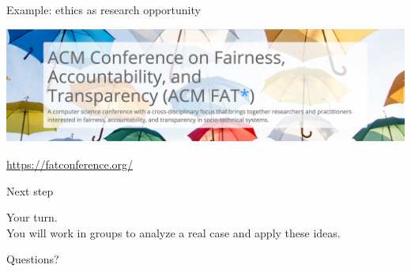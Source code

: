 \documentclass{beamer}
\def\vf{\vfill}
\begin{document}
\begin{frame}{Example: ethics as research opportunity}

\begin{center}
\includegraphics[width=\textwidth]{figures/fat_star}
\end{center}

\vf
\url{https://fatconference.org/}
\end{frame}
\begin{frame}{Next step}

Your turn.\\
You will work in groups to analyze a real case and apply these ideas. 

\end{frame}
\begin{frame}[standout]

\begin{center}
	\LARGE
	Questions?
\end{center}

\end{frame}
\end{document}

